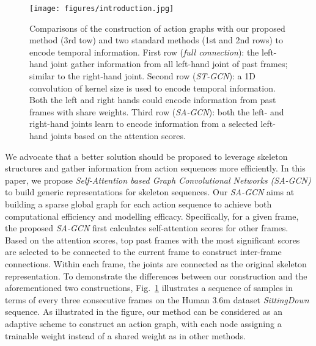 \documentclass[runningheads]{llncs}
\begin{document}
\begin{figure}[!t]
    \centering
    \texttt{[image: figures/introduction.jpg]}
    \caption{
    \small{Comparisons of the construction of action graphs with our proposed method (3rd tow) and two standard methods (1st and 2nd rows) to encode temporal information. First row (\textit{full connection}): the left-hand joint gather information from all left-hand joint of past frames; similar to the right-hand joint. Second row (\textit{ST-GCN}): a 1D convolution of kernel size  is used to encode temporal information. Both the left and right hands could encode information from past  frames with share weights. Third row (\textit{SA-GCN}): both the left- and right-hand joints learn to encode information from a selected left-hand joints based on the attention scores.} }
    \label{fig:introduction}
\end{figure}

We advocate that a better solution should be proposed to leverage skeleton structures and gather information from action sequences more efficiently. In this paper, we propose {\it Self-Attention based Graph Convolutional Networks (SA-GCN)} to build generic representations for skeleton sequences.
Our \textit{SA-GCN} aims at building a sparse global graph for each action sequence to achieve both computational efficiency and modelling efficacy. Specifically, for a given frame, the proposed {\it SA-GCN} first calculates self-attention scores for other frames. Based on the attention scores, top  past frames with the most significant scores are selected to be connected to the current frame to construct inter-frame connections. Within each frame, the joints are connected as the original skeleton representation. To demonstrate the differences between our construction and the aforementioned two constructions, Fig.~\ref{fig:introduction} illustrates a sequence of samples in terms of every three consecutive frames on the Human 3.6m dataset \textit{SittingDown} sequence. 
As illustrated in the figure, our method can be considered as an adaptive scheme to construct an action graph, with each node assigning a trainable weight instead of a shared weight as in other methods. 
\end{document}
